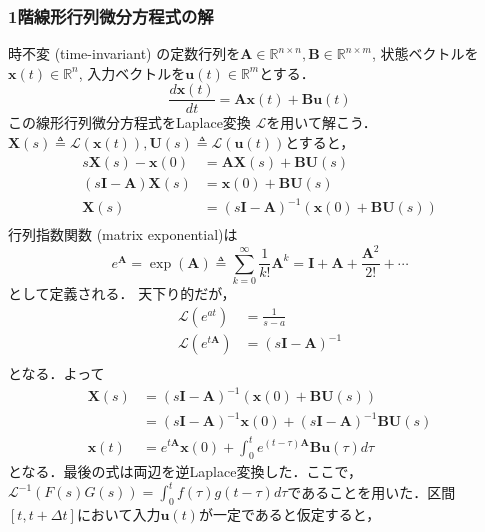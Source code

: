 \subsubsection{1階線形行列微分方程式の解}
時不変 (time-invariant) の定数行列を$\mathbf{A} \in \mathbb{R}^{n\times n}, \mathbf{B} \in \mathbb{R}^{n\times m}$, 状態ベクトルを$\mathbf{x}(t)\in\mathbb{R}^n$, 入力ベクトルを$\mathbf{u}(t)\in\mathbb{R}^m$とする．
\begin{equation}
\frac{d\mathbf{x}(t)}{dt} = \mathbf{A}\mathbf{x}(t) + \mathbf{B}\mathbf{u}(t)
\end{equation}
この線形行列微分方程式をLaplace変換 $\mathcal{L}$を用いて解こう．$\boldsymbol{X}(s) \triangleq \mathcal{L}(\mathbf{x}(t)), \boldsymbol{U}(s) \triangleq \mathcal{L}(\mathbf{u}(t))$とすると，
\begin{align}
s\boldsymbol{X}(s) - \mathbf{x}(0) &= \mathbf{A}\boldsymbol{X}(s)+ \mathbf{B}\boldsymbol{U}(s)\\
(s\mathbf{I} - \mathbf{A}) \boldsymbol{X}(s) &= \mathbf{x}(0) + \mathbf{B}\boldsymbol{U}(s)\\
\boldsymbol{X}(s) &= (s\mathbf{I} - \mathbf{A})^{-1}(\mathbf{x}(0) + \mathbf{B}\boldsymbol{U}(s))\\
\end{align}
行列指数関数 (matrix exponential)は
\begin{equation}
e^\mathbf{A} = \exp(\mathbf{A}) \triangleq \sum_{k=0}^\infty \frac{1}{k!}\mathbf{A}^k = \mathbf{I}+\mathbf{A}+\frac{\mathbf{A}^2}{2!}+\cdots
\end{equation}
として定義される．
天下り的だが，
\begin{align}
\mathcal{L}(e^{at})&=\frac{1}{s-a}\\
\mathcal{L}(e^{t\mathbf{A}})&=(s\mathbf{I} - \mathbf{A})^{-1}\\
\end{align}
となる．よって
\begin{align}
\boldsymbol{X}(s) &= (s\mathbf{I} - \mathbf{A})^{-1}(\mathbf{x}(0) + \mathbf{B}\boldsymbol{U}(s))\\
&= (s\mathbf{I} - \mathbf{A})^{-1}\mathbf{x}(0) + (s\mathbf{I} - \mathbf{A})^{-1}\mathbf{B}\boldsymbol{U}(s)\\
\mathbf{x}(t)&=e^{t\mathbf{A}}\mathbf{x}(0)+\int_0^t e^{(t-\tau)\mathbf{A}}\mathbf{B}\mathbf{u}(\tau) d\tau
\end{align}
となる．最後の式は両辺を逆Laplace変換した．ここで，$\mathcal{L}^{-1}(F(s)G(s))=\int_0^tf(\tau)g(t-\tau)d\tau$であることを用いた．区間$[t, t+\Delta t]$において入力$\mathbf{u}(t)$が一定であると仮定すると，
